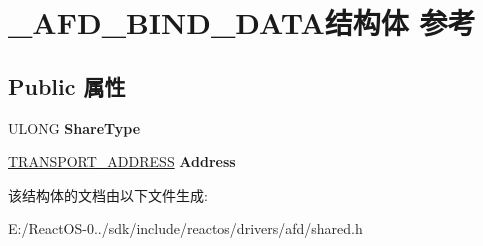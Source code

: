 \hypertarget{struct___a_f_d___b_i_n_d___d_a_t_a}{}\section{\+\_\+\+A\+F\+D\+\_\+\+B\+I\+N\+D\+\_\+\+D\+A\+T\+A结构体 参考}
\label{struct___a_f_d___b_i_n_d___d_a_t_a}
\subsection*{Public 属性}
\begin{DoxyCompactItemize}
\item 
\mbox{\label{struct___a_f_d___b_i_n_d___d_a_t_a_ad436bcab782464eb8c8fa7098fdd96f4}} 
U\+L\+O\+NG {\bfseries Share\+Type}
\item 
\mbox{\label{struct___a_f_d___b_i_n_d___d_a_t_a_ad8530ba0ab9fe1163237a821736cee8d}} 
\hyperlink{struct___t_r_a_n_s_p_o_r_t___a_d_d_r_e_s_s}{T\+R\+A\+N\+S\+P\+O\+R\+T\+\_\+\+A\+D\+D\+R\+E\+SS} {\bfseries Address}
\end{DoxyCompactItemize}


该结构体的文档由以下文件生成\+:\begin{DoxyCompactItemize}
\item 
E\+:/\+React\+O\+S-\/0../sdk/include/reactos/drivers/afd/shared.\+h\end{DoxyCompactItemize}

